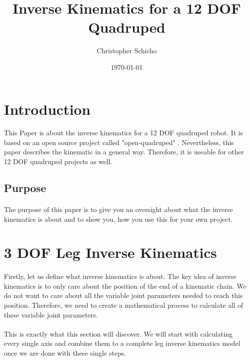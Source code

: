 \documentclass{article}
\title{Inverse Kinematics for a 12 DOF Quadruped}
\author{Christopher Schicho}
\date{\today}
\begin{document}
    \maketitle
    \tableofcontents
    \pagebreak



    \section{Introduction}
    \paragraph{} %
    This Paper is about the inverse kinematics for a 12 DOF quadruped robot. It is based on an open source project called "open-quadruped" . Nevertheless, this paper describes the kinematic in a general way. Therefore, it is useable for other 12 DOF quadruped projects as well. 

    \subsection{Purpose}
    \paragraph{}
    The purpose of this paper is to give you an oversight about what the inverse kinematics is about and to show you, how you use this for your own project.


    
    \section{3 DOF Leg Inverse Kinematics}
    \paragraph{} %
    Firstly, let us define what inverse kinematics is about. The key idea of inverse kinematics is to only care about the position of the end of a kinematic chain. We do not want to care about all the variable joint parameters needed to reach this position. Therefore, we need to create a mathematical process to calculate all of these variable joint parameters. 
    \paragraph{}
    This is exactly what this section will discover. We will start with calculating every single axis and combine them to a complete leg inverse kinematics model once we are done with these single steps.
    
\end{document}
